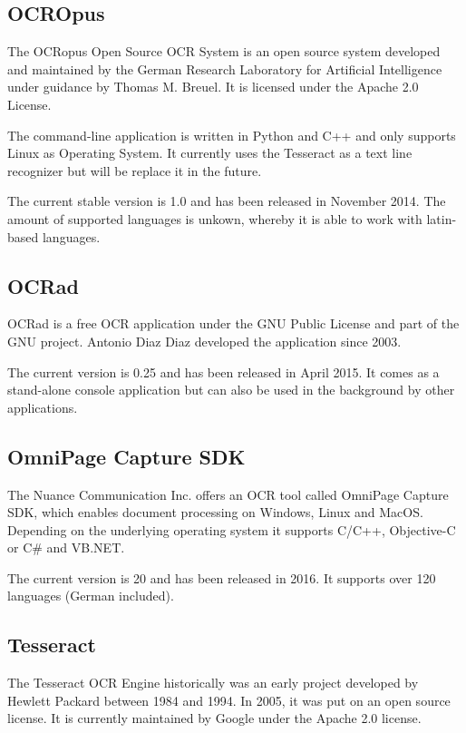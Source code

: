 \label{OCROpus}
\subsection{OCROpus}
The OCRopus Open Source OCR System is an open source system developed and maintained by the German Research Laboratory for Artificial Intelligence under guidance by Thomas M. Breuel. It is licensed under the Apache 2.0 License. 

The command-line application is written in Python and C++ and only supports Linux as Operating System. It currently uses the Tesseract as a text line recognizer but will be replace it in the future. 

The current stable version is 1.0 and has been released in November 2014. The amount of supported languages is unkown, whereby it is able to work with latin-based languages.

\label{OCRad}
\subsection{OCRad}
OCRad is a free OCR application under the GNU Public License and part of the GNU project. Antonio Diaz Diaz developed the application since 2003.

The current version is 0.25 and has been released in April 2015. It comes as a stand-alone console application but can also be used in the background by other applications.

\label{OmniPage}
\subsection{OmniPage Capture SDK}
The Nuance Communication Inc. offers an OCR tool called OmniPage Capture SDK, which enables document processing on Windows, Linux and MacOS. Depending on the underlying operating system it supports C/C++, Objective-C or C\# and VB.NET.

The current version is 20 and has been released in 2016. It supports over 120 languages (German included).

\label{Tesseract}
\subsection{Tesseract}
The Tesseract OCR Engine historically was an early project developed by Hewlett Packard between 1984 and 1994. In 2005, it was put on an open source license. It is currently maintained by Google under the Apache 2.0 license.

